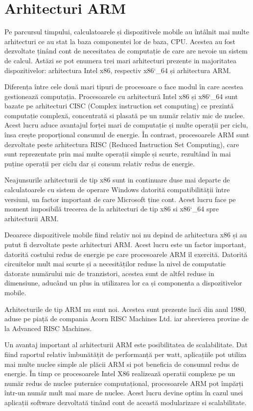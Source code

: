 	\section{Arhitecturi ARM}
	Pe parcursul timpului, calculatoarele și dispozitivele mobile au întâlnit mai multe arhitecturi ce au stat la baza componentei lor de baza, CPU. Acestea au fost dezvoltate ținând cont de necesitatea de computație de care are nevoie un sistem de calcul. Astăzi se pot enumera trei mari arhitecturi prezente in majoritatea dispozitivelor: arhitectura Intel x86, respectiv x86\char`_64 și arhitectura ARM. 
	
	Diferența între cele două mari tipuri de procesoare o face modul în care acestea gestionează computația. Procesoarele cu arhitectură Intel x86 și x86\char`_64 sunt bazate pe arhitecturi CISC (Complex instruction set computing) ce prezintă computație complexă, concentrată si plasată pe un număr relativ mic de nuclee. Acest lucru aduce avantajul forței mari de computație și multe operații per ciclu, însa crește proporțional consumul de energie. În contrast, procesoarele ARM sunt dezvoltate peste arhitectura RISC (Reduced Instruction Set Computing), care sunt reprezentate prin mai multe operații simple și scurte, rezultând în mai puține operații per ciclu dar și consum relativ redus de energie. 
	
	Neajunsurile arhitecturii de tip x86 sunt in continuare duse mai departe de calculatoarele cu sistem de operare Windows datorită compatibilității între versiuni, un factor important de care Microsoft ține cont. Acest lucru face pe moment imposibilă trecerea de la arhitecturi de tip x86 si x86\char`_64 spre arhitecturii ARM. 
	
	Deoarece dispozitivele mobile fiind relativ noi nu depind de arhitectura x86 și au putut fi dezvoltate peste arhitecturi ARM. Acest lucru este un factor important, datorită costului redus de energie pe care procesoarele ARM îl exercită. Datorită circuitelor mult mai scurte și a necesităților reduse la nivel de computatie datorate numărului mic de tranzistori, acestea sunt de altfel reduse in dimensiune, aducând un plus in utilizarea lor ca și componenta a dispozitivelor mobile.
	
	Arhitecturile de tip ARM nu sunt noi. Acestea sunt prezente încă din anul 1980, aduse pe piață de compania Acorn RISC Machines Ltd. iar abrevierea provine de la Advanced RISC Machines. 
	
	Un avantaj important al arhitecturii ARM este posibilitatea de scalabilitate. Dat fiind raportul relativ îmbunătățit de performanță per watt, aplicațiile pot utiliza mai multe nuclee simple ale plăcii ARM si pot beneficia de consumul redus de energie. În timp ce procesoarele Intel X86 realizează operatii complexe pe un număr redus de nuclee puternice computațional, procesoarele ARM pot împărți într-un număr mult mai mare de nuclee. Acest lucru devine optim în cazul unei aplicații software dezvoltată tinând cont de această modularizare si scalabilitate.
	\cite{arm_architecture_android}
	

